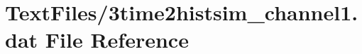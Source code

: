 \hypertarget{3time2histsim__channel1_8dat}{}\section{Text\+Files/3time2histsim\+\_\+channel1.dat File Reference}
\label{3time2histsim__channel1_8dat}

